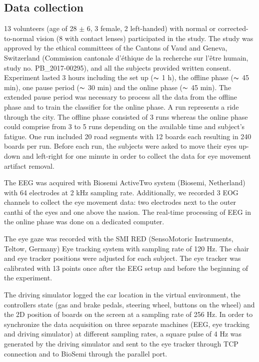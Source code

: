 \documentclass[12pt]{iopart}
\begin{document}
\subsection{Data collection}

13 volunteers (age of 28 $\pm$ 6, 3 female, 2 left-handed) with normal or
corrected-to-normal vision (8 with contact lenses) participated in the study.
The study was approved by the ethical committees of the 
Cantons of Vaud and Geneva, Switzerland (Commission cantonale
d'\'ethique de la recherche sur l'\^etre humain, study no. PB\_2017-00295),
and all the subjects provided written consent.
Experiment lasted 3 hours including the set up ($\thicksim$ 1 h), the offline phase ($\thicksim$ 45 min),
one pause period ($\thicksim$ 30 min) and the online phase ($\thicksim$ 45 min).
The extended pause period was necessary to process all the data
from the offline phase and to train the classifier for the online phase.
A run represents a ride through the city. The offline phase consisted of 3 runs whereas the online
phase could comprise from 3 to 5 runs depending on the available time
and subject's fatigue.
One run included 20 road segments with 12 boards each resulting in 240 boards per run.
Before each run, the subjects were asked to move their eyes up-down and left-right
for one minute in order to collect the data for eye movement artifact removal.

The EEG was acquired with Biosemi ActiveTwo system (Biosemi, Netherland) with 64 electrodes at 2 kHz sampling rate.
Additionally, we recorded 3 EOG channels to collect the eye movement data:
two electrodes next to the outer canthi of the eyes and one above the nasion.
The real-time processing
of EEG in the online phase was done on a dedicated computer.

The eye gaze was recorded with the SMI RED (SensoMotoric Instruments, Teltow, Germany) Eye tracking system 
with sampling rate of 120 Hz.
The chair and eye tracker positions were adjusted for each subject.
The eye tracker
was calibrated with 13 points once after the EEG setup and before the beginning of 
the experiment.

The driving simulator logged the car location in the virtual environment,
the controllers state (gas and brake pedals, steering wheel,
buttons on the wheel)
and the 2D position of boards on the screen at a sampling rate
of 256 Hz. In order to synchronize the data acquisition on three separate machines
(EEG, eye tracking and driving simulator) at different sampling rates,
a square pulse of 4 Hz was generated by the driving simulator and sent 
to the eye tracker through TCP connection and to BioSemi through the parallel port.
\end{document}
